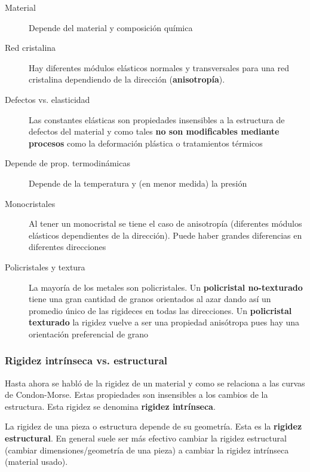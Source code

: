 \begin{description}
	\item[Material] Depende del material y composición química
	\item[Red cristalina] Hay diferentes módulos elásticos normales y transversales para una red cristalina dependiendo de la dirección (\textbf{anisotropía}). 
	\item[Defectos vs. elasticidad] Las constantes elásticas son propiedades insensibles a la estructura de defectos del material y como tales \textbf{no son modificables mediante procesos} como la deformación plástica o tratamientos térmicos
	\item[Depende de prop. termodinámicas] Depende de la temperatura y (en menor medida) la presión
	\item[Monocristales] Al tener un monocristal se tiene el caso de anisotropía (diferentes módulos elásticos dependientes de la dirección). Puede haber grandes diferencias en diferentes direcciones
	\item[Policristales y textura] La mayoría de los metales son policristales. Un \textbf{policristal no-texturado} tiene una gran cantidad de granos orientados al azar dando así un promedio único de las rigideces en todas las direcciones. Un \textbf{policristal texturado} la rigidez vuelve a ser una propiedad anisótropa pues hay una orientación preferencial de grano
\end{description}



\subsubsection{Rigidez intrínseca vs. estructural}

Hasta ahora se habló de la rigidez de un material y como se relaciona a las curvas de Condon-Morse. Estas propiedades son insensibles a los cambios de la estructura. Esta rigidez se denomina \textbf{rigidez intrínseca}.

La rigidez de una pieza o estructura depende de su geometría. Esta es la \textbf{rigidez estructural}. En general suele ser más efectivo cambiar la rigidez estructural (cambiar dimensiones/geometría de una pieza) a cambiar la rigidez intrínseca (material usado).


